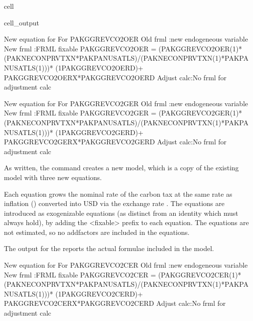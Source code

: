 \documentclass[letterpaper,10pt,english]{jupyterBook}
\begin{document}
\begin{sphinxuseclass}{cell}
\begin{sphinxVerbatimOutput}
\begin{sphinxuseclass}{cell_output}
\begin{sphinxVerbatim}[commandchars=\\\{\}]
New equation for For PAKGGREVCO2OER
Old frml   :new endogeneous variable 
New frml   :FRML \PYGZlt{}fixable\PYGZgt{} PAKGGREVCO2OER = (PAKGGREVCO2OER(\PYGZhy{}1)*(PAKNECONPRVTXN*PAKPANUSATLS)/(PAKNECONPRVTXN(\PYGZhy{}1)*PAKPANUSATLS(\PYGZhy{}1)))* (1\PYGZhy{}PAKGGREVCO2OER\PYGZus{}D)+ PAKGGREVCO2OER\PYGZus{}X*PAKGGREVCO2OER\PYGZus{}D\PYGZdl{}
Adjust calc:No frml for adjustment calc  

New equation for For PAKGGREVCO2GER
Old frml   :new endogeneous variable 
New frml   :FRML \PYGZlt{}fixable\PYGZgt{} PAKGGREVCO2GER = (PAKGGREVCO2GER(\PYGZhy{}1)*(PAKNECONPRVTXN*PAKPANUSATLS)/(PAKNECONPRVTXN(\PYGZhy{}1)*PAKPANUSATLS(\PYGZhy{}1)))* (1\PYGZhy{}PAKGGREVCO2GER\PYGZus{}D)+ PAKGGREVCO2GER\PYGZus{}X*PAKGGREVCO2GER\PYGZus{}D\PYGZdl{}
Adjust calc:No frml for adjustment calc  
\end{sphinxVerbatim}

\end{sphinxuseclass}\end{sphinxVerbatimOutput}

\end{sphinxuseclass}
\sphinxAtStartPar
As written, the  command creates a new model, which is a copy of the existing model with three new equations.

\sphinxAtStartPar
Each equation grows the nominal rate of the carbon tax at the same rate as inflation () converted into USD via the exchange rate . The equations are introduced as exogenizable equations (as distinct from an identity which must always hold), by adding the <fixable> prefix to each equation. The equations are not estimated, so no add\sphinxhyphen{}factors are included in the equations.

\sphinxAtStartPar
The output for the  reports the actual formulae included in the model.

\begin{sphinxVerbatim}[commandchars=\\\{\}]
New equation for For PAKGGREVCO2CER
Old frml   :new endogeneous variable 
New frml   :FRML \PYGZlt{}fixable\PYGZgt{} PAKGGREVCO2CER = (PAKGGREVCO2CER(\PYGZhy{}1)*(PAKNECONPRVTXN*PAKPANUSATLS)/(PAKNECONPRVTXN(\PYGZhy{}1)*PAKPANUSATLS(\PYGZhy{}1)))* (1\PYGZhy{}PAKGGREVCO2CER\PYGZus{}D)+ PAKGGREVCO2CER\PYGZus{}X*PAKGGREVCO2CER\PYGZus{}D\PYGZdl{}
Adjust calc:No frml for adjustment calc 
\end{sphinxVerbatim}
\end{document}

